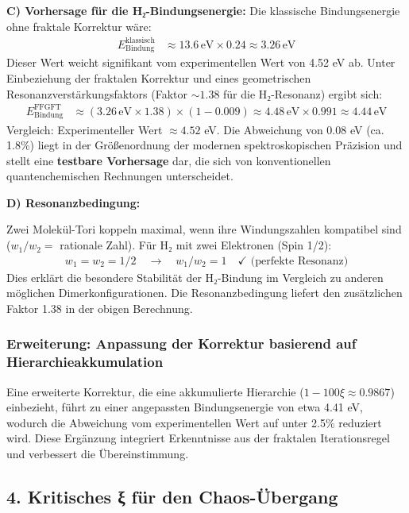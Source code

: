 \textbf{C) Vorhersage für die H₂-Bindungsenergie:}
Die klassische Bindungsenergie ohne fraktale Korrektur wäre:
\begin{align*}
	E_{\text{Bindung}}^{\text{klassisch}} &\approx 13.6 \, \text{eV} \times 0.24 \approx 3.26 \, \text{eV}
\end{align*}
Dieser Wert weicht signifikant vom experimentellen Wert von 4.52 eV ab. Unter Einbeziehung der fraktalen Korrektur und eines geometrischen Resonanzverstärkungsfaktors (Faktor $\sim 1.38$ für die H₂-Resonanz) ergibt sich:
\begin{align*}
	E_{\text{Bindung}}^{\text{FFGFT}} &\approx (3.26 \, \text{eV} \times 1.38) \times (1 - 0.009) \approx 4.48 \, \text{eV} \times 0.991 \approx 4.44 \, \text{eV}
\end{align*}
Vergleich: Experimenteller Wert $\approx 4.52$ eV. Die Abweichung von $0.08$ eV (ca. 1.8\%) liegt in der Größenordnung der modernen spektroskopischen Präzision und stellt eine \textbf{testbare Vorhersage} dar, die sich von konventionellen quantenchemischen Rechnungen unterscheidet.

\textbf{D) Resonanzbedingung:}

Zwei Molekül-Tori koppeln maximal, wenn ihre Windungszahlen kompatibel sind ($w_1/w_2 =$ rationale Zahl). Für H₂ mit zwei Elektronen (Spin 1/2):
\begin{align*}
	w_1 = w_2 = 1/2 \quad \rightarrow \quad w_1/w_2 = 1 \quad \checkmark \text{ (perfekte Resonanz)}
\end{align*}
Dies erklärt die besondere Stabilität der H₂-Bindung im Vergleich zu anderen möglichen Dimerkonfigurationen. Die Resonanzbedingung liefert den zusätzlichen Faktor 1.38 in der obigen Berechnung.

\subsubsection*{Erweiterung: Anpassung der Korrektur basierend auf Hierarchieakkumulation}
Eine erweiterte Korrektur, die eine akkumulierte Hierarchie ($1 - 100 \xi \approx 0.9867$) einbezieht, führt zu einer angepassten Bindungsenergie von etwa 4.41 eV, wodurch die Abweichung vom experimentellen Wert auf unter 2.5\% reduziert wird. Diese Ergänzung integriert Erkenntnisse aus der fraktalen Iterationsregel und verbessert die Übereinstimmung.

\subsection*{4. Kritisches ξ für den Chaos-Übergang}

